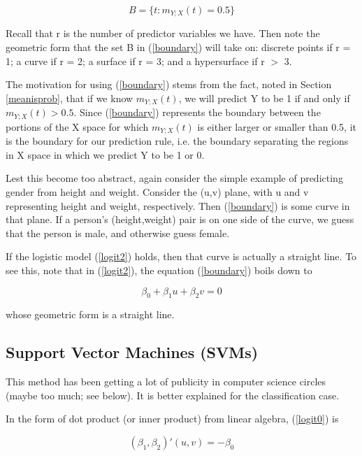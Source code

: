 \begin{equation}
\label{boundary}
B = \{t: m_{Y;X}(t) = 0.5\}
\end{equation}

Recall that r is the number of predictor variables we have.  Then note
the geometric form that the set B in (\ref{boundary}) will take on:
discrete points if r = 1; a curve if r = 2; a surface if r = 3; and a
hypersurface if r $>$ 3.

The motivation for using (\ref{boundary}) stems from the fact, noted in
Section \ref{meanisprob}, that if we know $m_{Y;X}(t)$, we will predict
Y to be 1 if and only if $m_{Y;X}(t) > 0.5$.  Since (\ref{boundary})
represents the boundary between the portions of the X space for which
$m_{Y;X}(t)$ is either larger or smaller than 0.5, it is the boundary
for our prediction rule, i.e. the boundary separating the regions in X
space in which we predict Y to be 1 or 0.

Lest this become too abstract, again consider the simple example of
predicting gender from height and weight.  Consider the (u,v) plane,
with u and v representing height and weight, respectively.  Then
(\ref{boundary}) is some curve in that plane.  If a person's
(height,weight) pair is on one side of the curve, we guess that the
person is male, and otherwise guess female.

If the logistic model (\ref{logit2}) holds, then that curve is actually
a straight line.  To see this, note that in (\ref{logit2}), the equation
(\ref{boundary}) boils down to 

\begin{equation}
\label{logit0}
\beta_0+\beta_1 u + \beta_2 v = 0
\end{equation}

whose geometric form is a straight line.

\subsection{Support Vector Machines (SVMs)}

This method has been getting a lot of publicity in computer science
circles (maybe too much; see below).  It is better explained for the
classification case.

In the form of dot product (or inner product) from linear algebra,
(\ref{logit0}) is

\begin{equation}
\label{dotprod}
(\beta_1, \beta_2)' (u,v) = -\beta_0
\end{equation}

